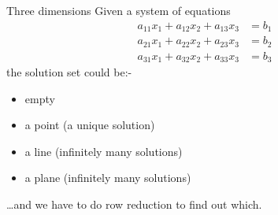 \documentclass{beamer}
\begin{document}
\begin{frame}{Three dimensions}
  Given a system of equations
  \begin{align*}
    a_{11}x_1+a_{12}x_2+a_{13}x_3 & = b_1\\
    a_{21}x_1+a_{22}x_2+a_{23}x_3 & = b_2\\
    a_{31}x_1+a_{32}x_2+a_{33}x_3 & = b_3
  \end{align*}\vfill
  the solution set could be:-
  \begin{itemize}
  \item empty
  \item a point (a unique solution)
  \item a line (infinitely many solutions)
  \item a plane (infinitely many solutions)
  \end{itemize}
  \dots and we have to do row reduction to find out which.
\end{frame}
\end{document}

